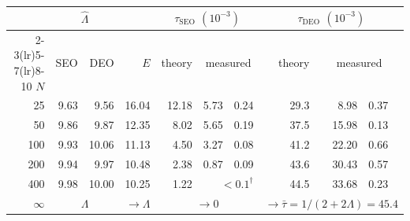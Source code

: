 
\providecommand{\tabSEO}{}\providecommand{\tabDEO}{}

{\centering
\footnotesize
\renewcommand{\arraystretch}{1.18}
\begin{tabular}{@{}
  r                                 %
  @{\hspace{9pt}}r r                %
  @{\hspace{9pt}}r                  %
  @{\hspace{10pt}}r                 %
  @{\hspace{7pt}}r@{$\,\pm\,$}l     %
  @{\hspace{10pt}}r                 %
  @{\hspace{7pt}}r@{$\,\pm\,$}l     %
  @{}}
\toprule
 & \multicolumn{2}{c}{$\hat\Lambda$} & &
   \multicolumn{3}{c}{\textcolor{tabSEOc}{$\tau_{\mathrm{SEO}}$}
     {\color{tabMuted}$(10^{-3})$}} &
   \multicolumn{3}{c}{\textcolor{tabDEOc}{$\tau_{\mathrm{DEO}}$}
     {\color{tabMuted}$(10^{-3})$}} \\
\cmidrule(lr){2-3}\cmidrule(lr){5-7}\cmidrule(lr){8-10}
$N$ & \textcolor{tabSEOc}{SEO} & \textcolor{tabDEOc}{DEO} & $E$ &
  {\color{tabMuted}theory} & \multicolumn{2}{c}{measured} &
  {\color{tabMuted}theory} & \multicolumn{2}{c}{measured} \\
\midrule
 25 &  9.63 &  9.56 & 16.04 & {\color{tabMuted}12.18} &  5.73 & 0.24 & {\color{tabMuted}29.3} &  8.98 & 0.37 \\
 50 &  9.86 &  9.87 & 12.35 & {\color{tabMuted} 8.02} &  5.65 & 0.19 & {\color{tabMuted}37.5} & 15.98 & 0.13 \\
100 &  9.93 & 10.06 & 11.13 & {\color{tabMuted} 4.50} &  3.27 & 0.08 & {\color{tabMuted}41.2} & 22.20 & 0.66 \\
200 &  9.94 &  9.97 & 10.48 & {\color{tabMuted} 2.38} &  0.87 & 0.09 & {\color{tabMuted}43.6} & 30.43 & 0.57 \\
400 &  9.98 & 10.00 & 10.25 & {\color{tabMuted} 1.22} &
  \multicolumn{2}{r}{$<0.1^{\dagger}$} & {\color{tabMuted}44.5} & 33.68 & 0.23 \\
\midrule
{\color{tabMuted}$\infty$} & \multicolumn{2}{c}{\color{tabMuted}$\Lambda$} &
  {\color{tabMuted}$\to\Lambda$} &
  \multicolumn{3}{c}{\color{tabMuted}$\to 0$} &
  \multicolumn{3}{c}{\color{tabMuted}$\to\bar\tau = 1/(2+2\Lambda) = 45.4$} \\
\bottomrule
\end{tabular}\par}
